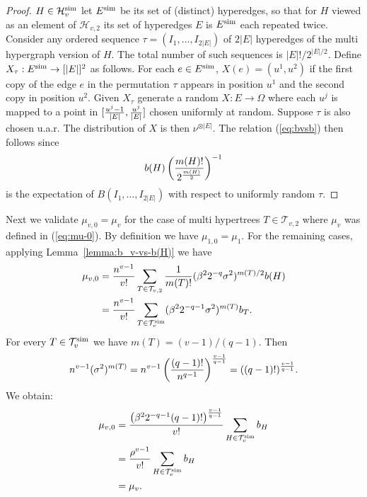 \documentclass[12pt]{article}
\newcommand{\cH}{\mathcal{H}}
\newcommand{\cT}{\mathcal{T}}
\begin{document}
\begin{proof}
$H\in \cH_v^{\rm sim}$ let $E^{\rm sim}$ be its set of (distinct) hyperedges, so that for $H$ viewed as an element of $\cH_{v,2}$
its set of hyperedges $E$ is $E^{\rm sim}$ each repeated twice.
Consider any ordered sequence $\tau=(I_1,\ldots,I_{2|E|})$ of $2|E|$ hyperedges of the multi hypergraph version of  $H$.
The total number of such sequences is $|E|!/2^{|E|/2}$.
Define $X_\tau:E^{\rm sim}\to [|E|]^2$ as follows. For each $e\in E^{\rm sim}$, 
$X(e)=(u^1,u^2)$ if the first copy of the edge $e$ in the permutation $\tau$ appears 
in position $u^1$ and the second copy in position $u^2$. Given $X_\tau$ generate a random $X:E\to \Omega$ where each $u^j$ is mapped
to a point in $[{u^j-1\over |E|},{u^j\over |E|}]$ chosen uniformly at random. Suppose $\tau$ is also chosen u.a.r. 
The distribution of $X$ is then $\nu^{\otimes |E|}$. The relation (\ref{eq:bvsb}) then follows since 
\begin{align*}
b(H)\left({m(H) ! \over 2^{m(H) \over 2}}\right)^{-1}
\end{align*}
is the expectation of $B(I_1,\ldots,I_{2|E|})$ with respect to uniformly random $\tau$. 
\end{proof}

Next we validate $\mu_{v,0}=\mu_v$ for the case of multi  hypertrees $T\in \cT_{v,2}$ where $\mu_v$ was defined in (\ref{eq:mu-0}). 
By definition we have $\mu_{1,0}=\mu_1$. For the remaining cases,
applying Lemma~\ref{lemma:b_v-vs-b(H)} we have
\begin{align*}
    \mu_{v,0} &= {n^{v-1}\over v!}\sum_{T\in \cT_{v,2}}{1\over  
    m(T)!}(\beta^2 2^{-q}\sigma^2)^{m(T)/2}b(H) \\
    &=
{n^{v-1}\over v!}\sum_{T\in \cT_{v}^{\rm sim}}(\beta^2 2^{-q-1}\sigma^2)^{m(T)}b_{T}.  
\end{align*}
For every $T\in \cT_{v}^{\rm sim}$ we have $m(T)=(v-1)/(q-1)$. Then
\begin{align*}
n^{v-1}(\sigma^2)^{m(T)}=n^{v-1}\left( { (q-1)!\over n^{q-1}}\right)^{v-1 \over q-1}=((q-1)!)^{v-1 \over q-1}.
\end{align*}
We obtain:
\begin{align*}
\mu_{v,0}&=
{\left(\beta^2 2^{-q-1}(q-1)!\right)^{v-1\over q-1}\over v!}\sum_{H\in \cT_{v}^{\rm sim}}b_{H} \\
&=
{\rho^{v-1}\over v!}\sum_{H\in \cT_{v}^{\rm sim}}b_{H} \\
&=\mu_v.
\end{align*}
\end{document}
